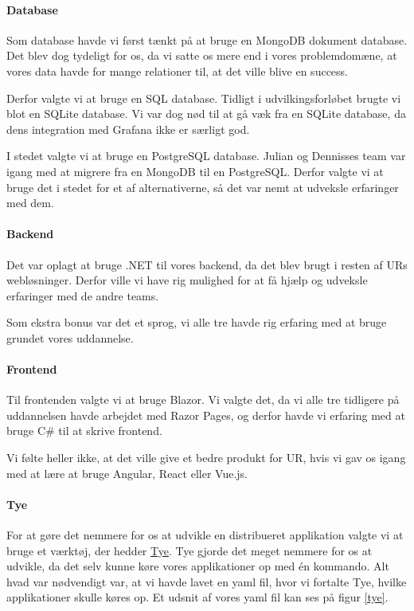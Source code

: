 \documentclass[a4paper]{article}
\begin{document}
\paragraph{Database}
Som database havde vi først tænkt på at bruge en MongoDB dokument database.
Det blev dog tydeligt for os, da vi satte os mere end i vores problemdomæne,
at vores data havde for mange relationer til, at det ville blive en success.

Derfor valgte vi at bruge en SQL database.
Tidligt i udvilkingsforløbet brugte vi blot en SQLite database.
Vi var dog nød til at gå væk fra en SQLite database,
da dens integration med Grafana ikke er særligt god.

I stedet valgte vi at bruge en PostgreSQL database.
Julian og Dennisses team var igang med at migrere fra en MongoDB til en PostgreSQL.
Derfor valgte vi at bruge det i stedet for et af alternativerne,
så det var nemt at udveksle erfaringer med dem.

\paragraph{Backend}
Det var oplagt at bruge .NET til vores backend,
da det blev brugt i resten af URs webløsninger.
Derfor ville vi have rig mulighed for at få hjælp
og udveksle erfaringer med de andre teams.

Som ekstra bonus var det et sprog, 
vi alle tre havde rig erfaring med at bruge grundet vores uddannelse.

\paragraph{Frontend}
Til frontenden valgte vi at bruge Blazor.
Vi valgte det,
da vi alle tre tidligere på uddannelsen havde arbejdet med Razor Pages,
og derfor havde vi erfaring med at bruge C\# til at skrive frontend.

Vi følte heller ikke, at det ville give et bedre produkt for UR,
hvis vi gav os igang med at lære at bruge Angular, React eller Vue.js.

\paragraph{Tye}
For at gøre det nemmere for os at udvikle en distribueret applikation
valgte vi at bruge et værktøj, der hedder
\href{https://github.com/dotnet/tye}{Tye}.
Tye gjorde det meget nemmere for os at udvikle,
da det selv kunne køre vores applikationer op med én kommando.
Alt hvad var nødvendigt var,
at vi havde lavet en yaml fil,
hvor vi fortalte Tye,
hvilke applikationer skulle køres op.
Et udsnit af vores yaml fil kan ses på figur \ref{tye}.
\end{document}
